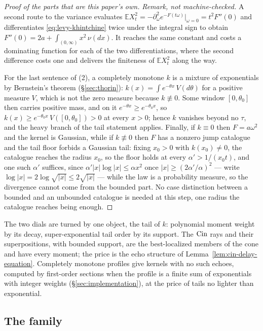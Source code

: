 \begin{proof}[Proof of the parts that are this paper's own]
\emph{Remark, not machine-checked.} A second route to the variance evaluates
$\mathbb{E}X_t^2 = -\partial_\omega^2 e^{-F(t\omega)}|_{\omega = 0} = t^2F''(0)$ and
differentiates \ref{eq:levy-khintchine} twice under the integral sign to obtain
$F''(0) = 2a + \int_{(0,\infty)}x^2\,\nu(dx)$. It reaches the same constant and costs a
dominating function for each of the two differentiations, where the second difference costs one
and delivers the finiteness of $\mathbb{E}X_t^2$ along the way.

For the last
sentence of (2), a completely monotone $k$ is a mixture of exponentials by Bernstein's theorem
(\S\ref{sec:thorin}): $k(x) = \int e^{-\theta x}\,V(d\theta)$ for a positive measure $V$, which is
not the zero measure because $k \not\equiv 0$. Some window $[0,\theta_0]$ then carries positive
mass, and on it $e^{-\theta x} \ge e^{-\theta_0x}$, so
$k(x) \ge e^{-\theta_0x}\,V([0,\theta_0]) > 0$ at every $x > 0$; hence
$k$ vanishes beyond no $\tau$, and the heavy branch of the tail statement applies. Finally, if
$k \equiv 0$ then $F = a\omega^2$ and the kernel is Gaussian, while if $k \not\equiv 0$ then
$F$ has a nonzero jump catalogue and the tail floor forbids a Gaussian tail: fixing $x_0 > 0$
with $k(x_0) \ne 0$, the catalogue reaches the radius $x_0$, so the floor holds at every
$\alpha' > 1/(x_0t)$, and one such $\alpha'$ suffices, since
$\alpha'|x|\log|x| \le \alpha x^2$ once $|x| \ge (2\alpha'/\alpha)^2$ --- write
$\log|x| = 2\log\sqrt{|x|} \le 2\sqrt{|x|}$ --- while the law is a probability measure, so the
divergence cannot come from the bounded part. No case distinction between a bounded and an
unbounded catalogue is needed at this step, one radius the catalogue reaches being enough.
\end{proof}

The two dials are turned by one object, the tail of $k$: polynomial moment weight by its decay,
super-exponential tail order by its support. The $\operatorname{Cin}$ rays and their superpositions, with
bounded support, are the best-localized members of the cone and have every moment; the price is
the echo structure of Lemma~\ref{lem:cin-delay-equation}. Completely monotone profiles give
kernels with no such echoes, computed by first-order sections when the profile is a finite
sum of exponentials with integer weights (\S\ref{sec:implementation}), at the price of tails
no lighter than exponential.

\subsection{The \texorpdfstring{\Matern{}}{Matern} family}\label{sec:matern}

